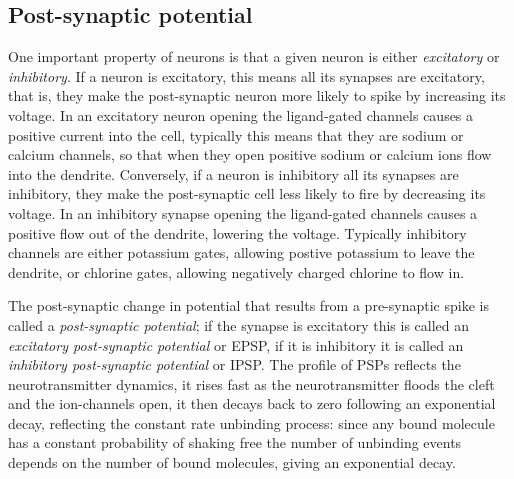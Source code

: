 \documentclass{article}
\begin{document}
\subsection*{Post-synaptic potential}

One important property of neurons is that a given neuron is either
\textsl{excitatory} or \textsl{inhibitory}. If a neuron is excitatory,
this means all its synapses are excitatory, that is, they make the
post-synaptic neuron more likely to spike by increasing its
voltage. In an excitatory neuron opening the ligand-gated channels
causes a positive current into the cell, typically this means that
they are sodium or calcium channels, so that when they open positive
sodium or calcium ions flow into the dendrite. Conversely, if a neuron
is inhibitory all its synapses are inhibitory, they make the
post-synaptic cell less likely to fire by decreasing its voltage. In
an inhibitory synapse opening the ligand-gated channels causes a
positive flow out of the dendrite, lowering the voltage. Typically
inhibitory channels are either potassium gates, allowing postive
potassium to leave the dendrite, or chlorine gates, allowing
negatively charged chlorine to flow in.

The post-synaptic change in potential that results from a pre-synaptic
spike is called a \textsl{post-synaptic potential}; if the synapse is
excitatory this is called an \textsl{excitatory post-synaptic
  potential} or EPSP, if it is inhibitory it is called an
\textsl{inhibitory post-synaptic potential} or IPSP. The profile of
PSPs reflects the neurotransmitter dynamics, it rises fast as the
neurotransmitter floods the cleft and the ion-channels open, it then
decays back to zero following an exponential decay, reflecting the
constant rate unbinding process: since any bound molecule has a
constant probability of shaking free the number of unbinding events
depends on the number of bound molecules, giving an exponential decay.
\end{document}
